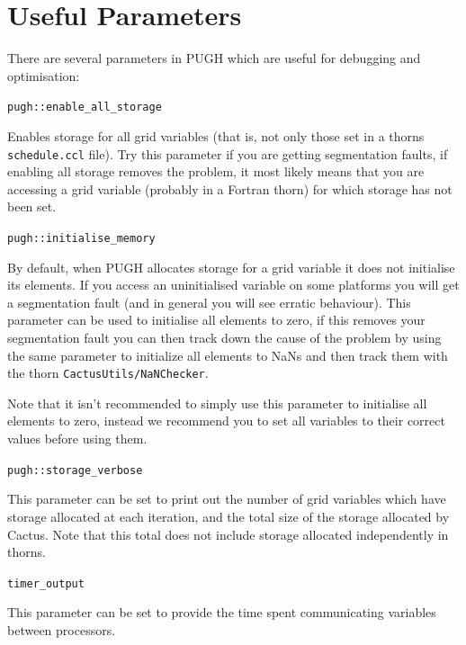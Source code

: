 \documentclass{article}
\newcommand{\entrylabel}[1]{\mbox{\textsf{#1}}\hfil}
\newenvironment{entry}
  {\begin{list}{}
    {\renewcommand{\makelabel}{\entrylabel}
      \setlength{\labelwidth}{90pt}
      \setlength{\leftmargin}{\labelwidth+\labelsep}
    }
  }
  {\end{list}}
\newlength{\Mylen}
\newcommand{\Lentrylabel}[1]{%
  \settowidth{\Mylen}{\textsf{#1}}%
  \ifthenelse{\lengthtest{\Mylen > \labelwidth}}%
    {\parbox[b]{\labelwidth} %
      {\makebox[0pt][l]{\textsf{#1}}\\}} %
    {\textsf{#1}} %

  \hfil\relax}
\newenvironment{Lentry}
  {\renewcommand{\entrylabel}{\Lentrylabel}
   \begin{entry}}
  {\end{entry}}
\begin{document}
\section{Useful Parameters}

There are several parameters in PUGH which are useful for debugging and 
optimisation:

\begin{Lentry}

\item[{\tt pugh::enable\_all\_storage}]

	Enables storage for all grid variables (that is, not only 
	those set in a thorns {\tt schedule.ccl} file). Try this parameter
	if you are getting segmentation faults, if enabling all storage
	removes the problem, it most likely means that you are accessing
	a grid variable (probably in a Fortran thorn) for which storage
	has not been set.

\item[{\tt pugh::initialise\_memory}]

	By default, when PUGH allocates storage for a grid variable it
	does not initialise its elements. If you access an
	uninitialised variable on some platforms you will get a
	segmentation fault (and in general you will see erratic
	behaviour). This parameter can be used to initialise all
	elements to zero, if this removes your segmentation fault you
	can then track down the cause of the problem by using the same
	parameter to initialize all elements to NaNs and then track 
	them with the thorn {\tt CactusUtils/NaNChecker}.

   	Note that it isn't recommended to simply use this parameter to 
	initialise all elements to zero, instead we recommend you to 
	set all variables to their correct values before using them.

\item[{\tt pugh::storage\_verbose}]

	This parameter can be set to print out the number of grid variables
	which have storage allocated at each iteration, and the total 
	size of the storage allocated by Cactus. Note that this total
	does not include storage allocated independently in thorns.

\item[{\tt timer\_output}]

	This parameter can be set to provide the time spent communicating
	variables between processors.

\end{Lentry}





\end{document}
